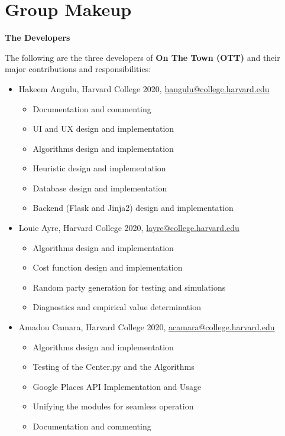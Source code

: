 \documentclass[11pt]{article}
\begin{document}
\section{Group Makeup}

\textbf{The Developers}

The following are the three developers of \textbf{On The Town (OTT)} and their major contributions and responsibilities:
\begin{itemize}
    \item Hakeem Angulu, Harvard College 2020, \href{mailto:hangulu@college.harvard.edu}{hangulu@college.harvard.edu}
    \begin{itemize}
        \item Documentation and commenting
        \item UI and UX design and implementation
        \item Algorithms design and implementation
        \item Heuristic design and implementation
        \item Database design and implementation
        \item Backend (Flask and Jinja2) design and implementation
    \end{itemize}
    \item Louie Ayre, Harvard College 2020, \href{mailto:layre@college.harvard.edu}{layre@college.harvard.edu}
    \begin{itemize}
        \item Algorithms design and implementation
        \item Cost function design and implementation
        \item Random party generation for testing and simulations
        \item Diagnostics and empirical value determination
    \end{itemize}
    \item Amadou Camara, Harvard College 2020, \href{mailto:acamara@college.harvard.edu}{acamara@college.harvard.edu}
    \begin{itemize}
        \item Algorithms design and implementation
        \item Testing of the Center.py and the Algorithms
        \item Google Places API Implementation and Usage
        \item Unifying the modules for seamless operation
        \item Documentation and commenting
    \end{itemize}
\end{itemize}

\newpage

 

\end{document}

